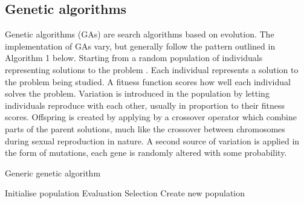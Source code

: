 
\subsection{Genetic algorithms}
\newline
{}
\newline
Genetic algorithms (GAs) are search algorithms based on evolution. The implementation of GAs vary, but
generally follow the pattern outlined in Algorithm 1 below. Starting from a random population of individuals
representing solutions to the problem . Each individual represents a solution to the problem being
studied. A fitness function scores how well each individual solves the problem. Variation is introduced
in the population by letting individuals reproduce with each other, usually in proportion to their fitness
scores. Offspring is created by applying by a crossover operator which combine parts of the parent solutions,
much like the crossover between chromosomes during sexual reproduction in nature. A second source of variation
is applied in the form of mutations, each gene is randomly altered with some probability.


\begin{algorithm}[H]
    \caption{Generic genetic algorithm}
    \begin{algorithmic}

    \State Initialise population
        \State Evaluation 
        \State Selection  
        \State Create new population 
    \EndWhile
\EndProcedure

\end{algorithmic}
\end{algorithm}

